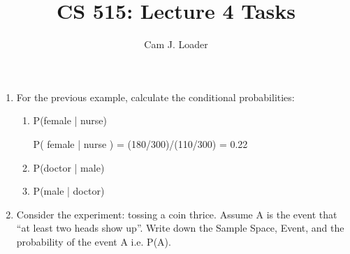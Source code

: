 \documentclass[12pt]{article}
\title{CS 515: Lecture 4 Tasks}
\author{Cam J. Loader}
\begin{document}
\maketitle

\begin{enumerate}
    \item For the previous example, calculate the conditional probabilities:
    \begin{enumerate} 
        \item  P(female | nurse)
        \begin{center}
            P( female | nurse ) = (180/300)/(110/300) =  0.22
        \end{center}
        \item  P(doctor | male)
        \item  P(male | doctor)
    \end{enumerate}
    \item Consider the experiment: tossing a coin thrice. Assume A is the event that “at least two heads
          show up”. Write down the Sample Space, Event, and the probability of the event A i.e. P(A).
\end{enumerate}
\end{document}
